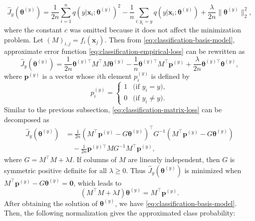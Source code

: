 \begin{equation}\label{eq:classification-empirical-loss}
\widehat J_y(\boldsymbol{\theta}^{(y)})=\frac1{2n}\sum_{i=1}^nq(y|\boldsymbol{x}_i;\boldsymbol{\theta}^{(y)})^2-\frac1n\sum_{i:y_i=y}q(y|\boldsymbol{x}_i;\boldsymbol{\theta}^{(y)})+\frac\lambda{2n}\|\boldsymbol{\theta}^{(y)}\|_2^2,
\end{equation}
{where the constant $c$ was omitted because it does not affect the minimization problem. Let $(M)_{i,j}=f_i(\boldsymbol{x}_j)$. Then from \eqref{eq:classification-basis-model}, approximate error function \eqref{eq:classification-empirical-loss} can be rewritten as}
\begin{equation}\label{eq:classification-matrix-loss}
\widehat J_y(\boldsymbol{\theta}^{(y)})=\frac1{2n}\boldsymbol{\theta}^{(y)\top}M^{\top}M\boldsymbol{\theta}^{(y)}-\frac1n\boldsymbol{\theta}^{(y)\top}M^{\top}\boldsymbol{p}^{(y)}+\frac\lambda{2n}\boldsymbol{\theta}^{(y)\top}\boldsymbol{\theta}^{(y)},
\end{equation}
{where $\boldsymbol{p}^{(y)}$ is a vector whose $i$th element $p_i^{(y)}$ is defined by}
\[p_i^{(y)}=\begin{cases}1&\text{(if }y_i=y),\\0&\text{(if }y_i\ne y).\end{cases}\]
{Similar to the previous subsection, \eqref{eq:classification-matrix-loss} can be decomposed as}
\[\begin{aligned}
\widehat J_y(\boldsymbol{\theta}^{(y)})&=\frac1{2n}\left(M^{\top}\boldsymbol{p}^{(y)}-G\boldsymbol{\theta}^{(y)}\right)^{\top}G^{-1}\left(M^{\top}\boldsymbol{p}^{(y)}-G\boldsymbol{\theta}^{(y)}\right)\\
&\quad-\frac1{2n}\boldsymbol{p}^{(y)\top}MG^{-1}M^{\top}\boldsymbol{p}^{(y)},
\end{aligned}\]
{where $G=M^{\top}M+\lambda I$. If columns of $M$ are linearly independent, then $G$ is symmetric positive definite for all $\lambda\ge0$. Thus $\widehat J_y(\boldsymbol{\theta}^{(y)})$ is minimized when $M^{\top}\boldsymbol{p}^{(y)}-G\boldsymbol{\theta}^{(y)}=\boldsymbol{0}$, which leads to}
\begin{equation}\label{eq:classification-normal-equations}
(M^{\top}M+\lambda I)\boldsymbol{\theta}^{(y)}=M^{\top}\boldsymbol{p}^{(y)}.
\end{equation}
{After obtaining the solution of $\boldsymbol{\theta}^{(y)}$, we have \eqref{eq:classification-basis-model}. Then, the following normalization gives the approximated class probability:}
